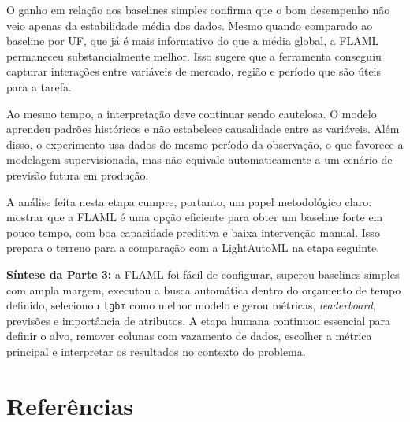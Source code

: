 \documentclass[11pt, a4paper, oneside]{article}
\begin{document}
O ganho em relação aos baselines simples confirma que o bom desempenho não veio apenas
da estabilidade média dos dados. Mesmo quando comparado ao baseline por UF, que já é
mais informativo do que a média global, a FLAML permaneceu substancialmente melhor.
Isso sugere que a ferramenta conseguiu capturar interações entre variáveis de mercado,
região e período que são úteis para a tarefa.

Ao mesmo tempo, a interpretação deve continuar sendo cautelosa. O modelo aprendeu
padrões históricos e não estabelece causalidade entre as variáveis. Além disso, o
experimento usa dados do mesmo período da observação, o que favorece a modelagem
supervisionada, mas não equivale automaticamente a um cenário de previsão futura em
produção.

A análise feita nesta etapa cumpre, portanto, um papel metodológico claro: mostrar que
a FLAML é uma opção eficiente para obter um baseline forte em pouco tempo, com boa
capacidade preditiva e baixa intervenção manual. Isso prepara o terreno para a
comparação com a LightAutoML na etapa seguinte.

\begin{notebox}
\textbf{Síntese da Parte 3:} a FLAML foi fácil de configurar, superou baselines simples
com ampla margem, executou a busca automática dentro do orçamento de tempo definido,
selecionou \texttt{lgbm} como melhor modelo e gerou métricas, \textit{leaderboard},
previsões e importância de atributos. A etapa humana continuou essencial para definir
o alvo, remover colunas com vazamento de dados, escolher a métrica principal e
interpretar os resultados no contexto do problema.
\end{notebox}
\newpage
\section*{Referências}
\end{document}
